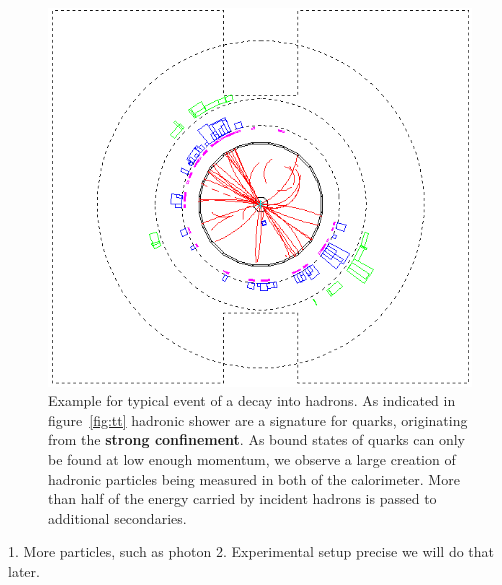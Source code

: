 \begin{figure}[htpb]
    \centering
    \includegraphics[width=0.8\linewidth]{figures/qq_02.png}
    \caption{Example for typical event of a decay into hadrons. As indicated in figure~\ref{fig:tt} hadronic shower are 
   a signature for quarks, originating from the \textbf{strong confinement}. 
   As bound states of quarks can only be found at low enough
   momentum, we observe a large creation of hadronic particles being
   measured in both of the calorimeter. More than half of
   the energy carried by incident hadrons is passed to additional secondaries. }
\label{fig:qq}
\end{figure}
1. More particles, such as photon
2. Experimental setup precise 
we will do that later.


\clearpage
